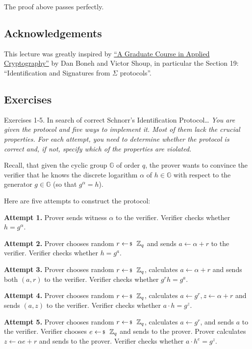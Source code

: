 \documentclass[../../book.tex]{subfiles}
\begin{document}
The proof above passes perfectly.

\subsection*{Acknowledgements}

This lecture was greatly inspired by \href{https://toc.cryptobook.us/}{``A
Graduate Course in Applied Cryptography''} by Dan Boneh and Victor Shoup, in
particular the Section 19: ``Identification and Signatures from $\Sigma$
protocols''.

\subsection{Exercises}

\begin{exbox}{Exercises 1-5. In search of correct Schnorr's Identification Protocol\ldots}
    \textit{You are given the protocol and five ways to implement it. Most of them lack the crucial properties. For each attempt, you need to determine whether the protocol is correct and, if not, specify which of the properties are violated.}
    \vspace{2px}
 
    Recall, that given the cyclic group $\mathbb{G}$ of order $q$, the prover wants to convince the verifier that he knows the discrete logarithm $\alpha$ of $h \in \mathbb{G}$ with respect to the generator $g \in \mathbb{G}$ (so that $g^{\alpha}=h$).

    Here are five attempts to construct the protocol:

    \textcolor{oc-pink-7}{\textbf{Attempt 1.}} Prover sends witness $\alpha$ to the verifier. Verifier checks whether $h = g^{\alpha}$.

    \textcolor{oc-pink-7}{\textbf{Attempt 2.}} Prover chooses random $r \leftarrowS \mathbb{Z}_q$ and sends $a \gets \alpha + r$ to the verifier. Verifier checks whether $h = g^a$.

    \textcolor{oc-pink-7}{\textbf{Attempt 3.}} Prover chooses random $r \leftarrowS \mathbb{Z}_q$, calculates $a \gets \alpha + r$ and sends both $(a,r)$ to the verifier. Verifier checks whether $g^r h = g^a$.

    \textcolor{oc-pink-7}{\textbf{Attempt 4.}} Prover chooses random $r \leftarrowS \mathbb{Z}_q$, calculates $a \gets g^r, z \gets \alpha+r$ and sends $(a,z)$ to the verifier. Verifier checks whether $a \cdot h = g^z$.

    \textcolor{oc-pink-7}{\textbf{Attempt 5.}} Prover chooses random $r \leftarrowS \mathbb{Z}_q$, calculates $a \gets g^r$, and sends $a$ to the verifier. Verifier chooses $e \leftarrowS \mathbb{Z}_q$ and sends to the prover. Prover calculates $z \gets \alpha e + r$ and sends to the prover. Verifier checks whether $a \cdot h^e = g^z$.


\end{exbox}
\end{document}
